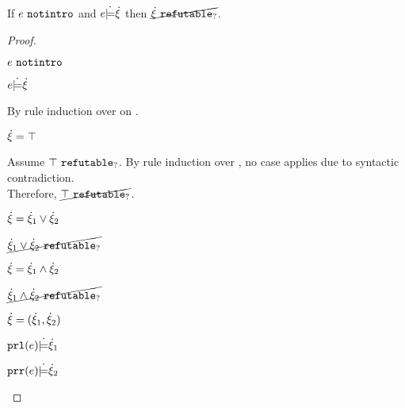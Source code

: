\begin{lemma}
\label{lem:satisfy-not-refutable}
If $e ~\mathtt{notintro}$ and $e \dot{\models} \dot{\xi}$ then $\cancel{\dot{\xi} ~\mathtt{refutable}_?}$.
\end{lemma}
\begin{proof}
\begin{pfsteps*}
\item $e ~\mathtt{notintro}$  
\item $e \dot{\models} \dot{\xi}$  
\end{pfsteps*}
By rule induction over  on .
\begin{byCases}
\item[\text{(\ref{rule:CSTruth})}]
    \begin{pfsteps*}
    \item $\dot{\xi}=\top$ 
    \end{pfsteps*}
    Assume $\top ~\mathtt{refutable}_?$. By rule induction over , no case applies due to syntactic contradiction.\\
    Therefore, $\cancel{\top ~\mathtt{refutable}_?}$.
\item[\text{(\ref{rule:CSOr1}),(\ref{rule:CSOr2})}]
    \begin{pfsteps*}
    \item $\dot{\xi}=\dot{\xi}_1 \vee \dot{\xi}_2$ 
    \item $\cancel{\dot{\xi}_1 \vee \dot{\xi}_2 ~\mathtt{refutable}_?}$ 
    \end{pfsteps*}
\item[\text{(\ref{rule:CSAnd})}]
    \begin{pfsteps*}
    \item $\dot{\xi}=\dot{\xi}_1 \wedge \dot{\xi}_2$ 
    \item $\cancel{\dot{\xi}_1 \wedge \dot{\xi}_2 ~\mathtt{refutable}_?}$ 
    \end{pfsteps*}
\item[\text{(\ref{rule:CSNotIntroPair})}]
    \begin{pfsteps*}
    \item $\dot{\xi}=(\dot{\xi}_1 , \dot{\xi}_2)$ 
    \item $\mathtt{prl}(e) \dot{\models} \dot{\xi}_1$  
    \item $\mathtt{prr}(e) \dot{\models} \dot{\xi}_2$  

\end{pfsteps*}
\end{byCases}
\end{proof}
